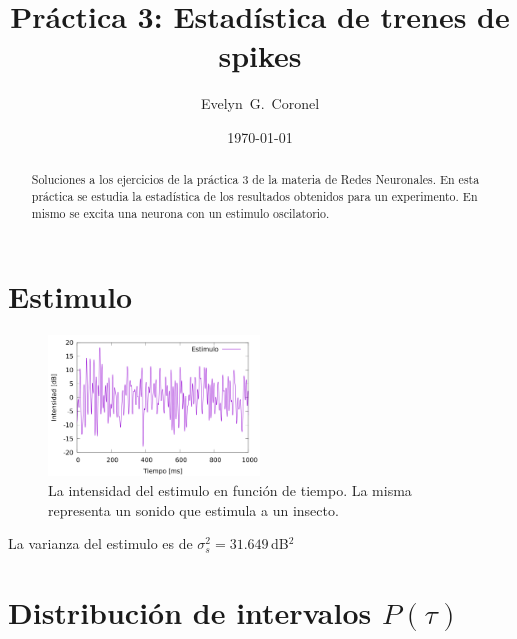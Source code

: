 
\usepackage{hyperref}


\title{Práctica 3: Estadística de trenes de spikes }
\author{Evelyn~G.~Coronel}


\date[]{\lowercase{\today}} %

\begin{abstract}
Soluciones a los ejercicios de la práctica 3 de la materia de Redes Neuronales. En esta práctica se estudia la estadística de los resultados obtenidos para un experimento. En mismo se excita una neurona con un estimulo oscilatorio.
\end{abstract} 
\maketitle

\section*{Estimulo}

\begin{figure}[H]
	\centering
	\includegraphics[width=0.5\textwidth]{../Graficos/stimulus.png}
	\caption{La intensidad del estimulo en función de tiempo. La misma representa un sonido que estimula a un insecto.}
\end{figure}


La varianza del estimulo es de $\sigma^2_{s}= 31.649\,$dB$^2$
\section*{Distribución de intervalos \texorpdfstring{$P(\tau)$}{}}

